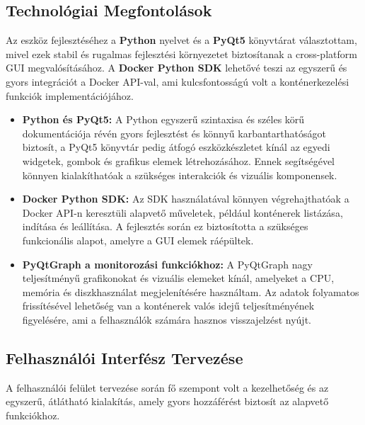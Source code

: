 \subsection{Technológiai Megfontolások}
Az eszköz fejlesztéséhez a \textbf{Python} nyelvet és a \textbf{PyQt5} könyvtárat választottam, mivel ezek stabil és rugalmas fejlesztési környezetet biztosítanak a cross-platform GUI megvalósításához. A \textbf{Docker Python SDK} lehetővé teszi az egyszerű és gyors integrációt a Docker API-val, ami kulcsfontosságú volt a konténerkezelési funkciók implementációjához.

\begin{itemize}
	\item \textbf{Python és PyQt5:} A Python egyszerű szintaxisa és széles körű dokumentációja révén gyors fejlesztést és könnyű karbantarthatóságot biztosít, a PyQt5 könyvtár pedig átfogó eszközkészletet kínál az egyedi widgetek, gombok és grafikus elemek létrehozásához. Ennek segítségével könnyen kialakíthatóak a szükséges interakciók és vizuális komponensek.
	\item \textbf{Docker Python SDK:} Az SDK használatával könnyen végrehajthatóak a Docker API-n keresztüli alapvető műveletek, például konténerek listázása, indítása és leállítása. A fejlesztés során ez biztosította a szükséges funkcionális alapot, amelyre a GUI elemek ráépültek.
	\item \textbf{PyQtGraph a monitorozási funkciókhoz:} A PyQtGraph nagy teljesítményű grafikonokat és vizuális elemeket kínál, amelyeket a CPU, memória és diszkhasználat megjelenítésére használtam. Az adatok folyamatos frissítésével lehetőség van a konténerek valós idejű teljesítményének figyelésére, ami a felhasználók számára hasznos visszajelzést nyújt.
\end{itemize}

\subsection{Felhasználói Interfész Tervezése}
A felhasználói felület tervezése során fő szempont volt a kezelhetőség és az egyszerű, átlátható kialakítás, amely gyors hozzáférést biztosít az alapvető funkciókhoz.

